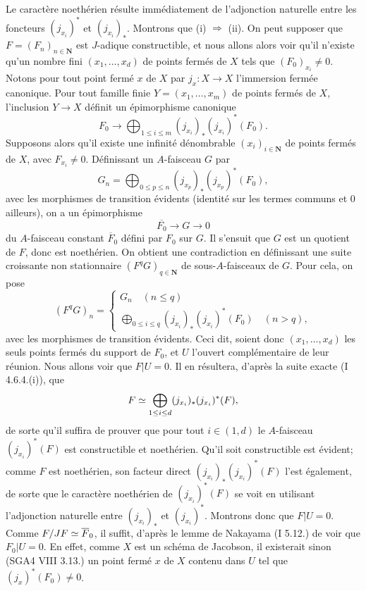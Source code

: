 Le caractère noethérien résulte immédiatement de l'adjonction naturelle entre les foncteurs $(j_{x_i})^*$ et $(j_{x_i})_*$. Montrons que (i) $\Rightarrow$ (ii). On peut supposer que $F = (F_n)_{n \in \mathbf{N}}$ est $J$-adique constructible, et nous allons alors voir qu'il n'existe qu'un nombre fini $(x_1, \dots, x_d)$ de points fermés de $X$ tels que $(F_0)_{x_i} \neq 0$. Notons pour tout point fermé $x$ de $X$ par $j_x: X \to X$ l'immersion fermée canonique. Pour tout famille finie $Y = (x_1, \dots, x_m)$ de points fermés de $X$, l'inclusion $Y \to X$ définit un épimorphisme canonique
$$
F_0 \to \bigoplus_{1 \leq i \leq m} (j_{x_i})_* (j_{x_i})^*(F_0).
$$
Supposons alors qu'il existe une infinité dénombrable $(x_i)_{i \in \mathbf{N}}$ de points fermés de $X$, avec $F_{x_i} \neq 0$. Définissant un $A$-faisceau $G$ par
$$
G_n = \bigoplus_{0 \leq p \leq n} (j_{x_p})_*(j_{x_p})^*(F_0),
$$
avec les morphismes de transition évidents (identité sur les termes communs et $0$ ailleurs), on a un épimorphisme
$$
\overline{F_0} \to G \to 0
$$
du $A$-faisceau constant $\overline{F}_0$ défini par $F_0$ sur $G$. Il s'ensuit que $G$ est un quotient de $F$, donc est noethérien. On obtient une contradiction en définissant une suite croissante non stationnaire $(F^q G)_{q \in \mathbf{N}}$ de sous-$A$-faisceaux de $G$. Pour cela, on pose
$$
(F^q G)_n = 
\begin{cases}
    G_n \quad (n \leq q) \\
    \bigoplus_{0 \leq i \leq q} (j_{x_i})_*(j_{x_i})^*(F_0) \quad (n > q),
\end{cases}
$$
avec les morphismes de transition évidents. Ceci dit, soient donc $(x_1, \dots, x_d)$ les seuls points fermés du support de $F_0$, et $U$ l'ouvert complémentaire de leur réunion. Nous allons voir que $F|U = 0$. Il en résultera, d'après la suite exacte (I 4.6.4.(i)), que 
$$
F \simeq \bigoplus_{1 \leq i \leq d} (j_{x_i})_*(j_{x_i})^*(F),
$$
de sorte qu'il suffira de prouver que pour tout $i \in (1, d)$ le $A$-faisceau $(j_{x_i})^*(F)$ est constructible et noethérien. Qu'il soit constructible est évident; comme $F$ est noethérien, son facteur direct $(j_{x_i})_*(j_{x_i})^*(F)$ l'est également, de sorte que le caractère noethérien de $(j_{x_i})^*(F)$ se voit en utilisant l'adjonction naturelle entre $(j_{x_i})_*$ et $(j_{x_i})^*$. Montrons donc que $F | U = 0$. Comme $F/JF \simeq \overline{F}_ 0$, il suffit, d'après le lemme de Nakayama (I 5.12.) de voir que $F_0 | U = 0$. En effet, comme $X$ est un schéma de Jacobson, il existerait sinon (SGA4 VIII 3.13.) un point fermé $x$ de $X$ contenu dans $U$ tel que $(j_x)^*(F_0) \neq 0$.


